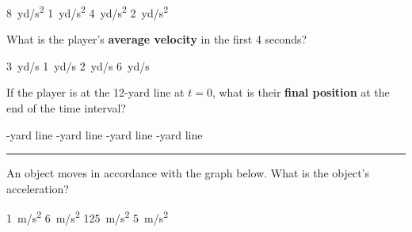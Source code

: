 \documentclass[addpoints]{exam}
\begin{document}
\begin{questions}
\begin{choices}
\choice \SI{8}{yd/s^2}
\correctchoice \SI{1}{yd/s^2}
\choice \SI{4}{yd/s^2}
\choice \SI{2}{yd/s^2}
\end{choices}

\question \label{prob:FootballPlayer2}
What is the player's \textbf{average velocity} in the first 4 seconds?

\begin{choices}
\choice \SI{3}{yd/s}
\choice \SI{1}{yd/s}
\choice \SI{2}{yd/s}
\correctchoice \SI{6}{yd/s}
\end{choices}

\question \label{prob:FootballPlayer3}
If the player is at the 12-yard line at $t=0$, what is their \textbf{final position} at the end of the time interval?

\begin{choices}
-yard line
-yard line
-yard line
-yard line
\end{choices}

\vspace{1em}
\hrule

\clearpage
\question
An object moves in accordance with the graph below. What is the object's acceleration?
\vspace{1em}

\begin{minipage}{0.3\textwidth}
    \begin{choices}
    \choice \SI{1}{m/s^2}
    \choice \SI{6}{m/s^2}
    \choice \SI{125}{m/s^2}
    \CorrectChoice \SI{5}{m/s^2}
    \end{choices}
\end{minipage}%
\begin{minipage}{0.3\textwidth}
\end{minipage}





\end{questions}
\end{document}
